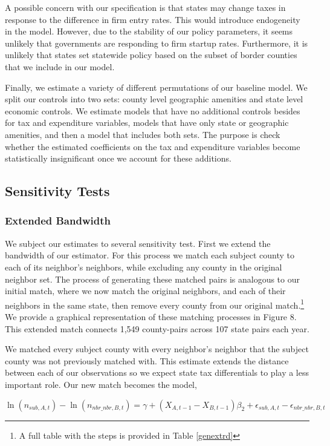 \documentclass[12pt,a4paper]{article}
\begin{document}
A possible concern with our specification is that states may change taxes in response to the difference in firm entry rates.  This would introduce endogeneity in the model.  However, due to the stability of our policy parameters, it seems unlikely that governments are responding to firm startup rates.  Furthermore, it is unlikely that states set statewide policy based on the subset of border  counties that we include in our model.

Finally, we estimate a variety of different permutations of our baseline model. We split our controls into two sets: county level geographic amenities and state level economic controls. We estimate models that have no additional controls besides for tax and expenditure variables, models that have only state or geographic amenities, and then a model that includes both sets. The purpose is check whether the estimated coefficients on the tax and expenditure variables become statistically insignificant once we account for these additions.

\subsection{Sensitivity Tests}

\subsubsection{Extended Bandwidth}

We subject our estimates to several sensitivity test.  First we extend the bandwidth of our estimator. For this process we match each subject county to each of its neighbor’s neighbors, while excluding any county in the original neighbor set. The process of generating these matched pairs is analogous to our initial match, where we now match the original neighbors, and each of their neighbors in the same state, then remove every county from our original match.\footnote{A full table with the steps is provided in Table \ref{genextrd}} We provide a graphical representation of these matching processes in Figure 8. This extended match connects 1,549 county-pairs across 107 state pairs each year. 

We matched every subject county with every neighbor's neighbor that the subject county was not previously matched with. This estimate extends the distance between each of our observations so we expect state tax differentials to play a less important role. Our new match becomes the model,

\begin{equation}
\ln(n_{sub,A,t})-\ln(n_{nbr\_nbr,B,t}) = \gamma + (X_{A,t-1}-X_{B,t-1})\beta_{2} + \epsilon_{sub,A,t}-\epsilon_{nbr\_nbr,B,t}
\end{equation}
\end{document}
